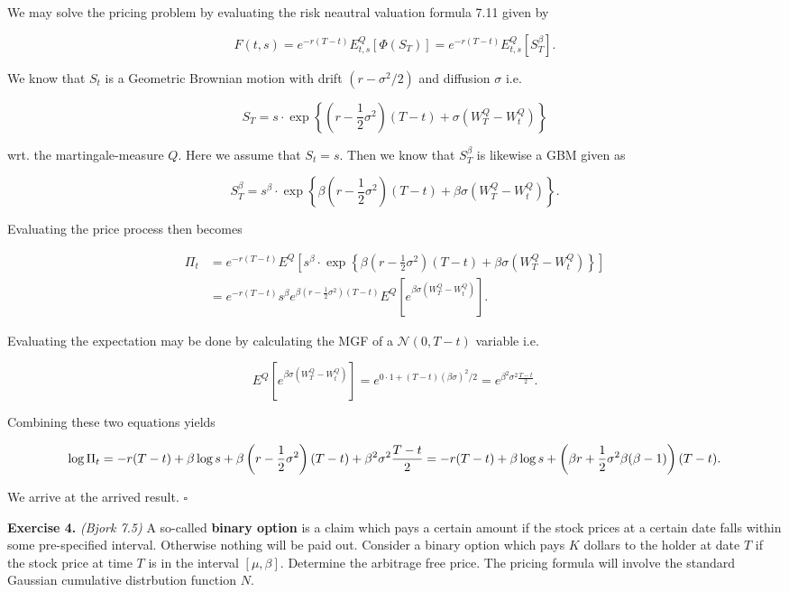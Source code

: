 \documentclass[
]{article}
\begin{document}
We may solve the pricing problem by evaluating the risk neautral
valuation formula 7.11 given by

\[
F(t,s)=e^{-r(T-t)}E^Q_{t,s}[\Phi(S_T)]=e^{-r(T-t)}E^Q_{t,s}[S_T^\beta].
\]

We know that \(S_t\) is a Geometric Brownian motion with drift
\((r-\sigma^2/2)\) and diffusion \(\sigma\) i.e.

\[
S_T=s\cdot\exp\left\{\left(r-\frac{1}{2}\sigma^2\right)(T-t)+\sigma (W_T^Q-W_t^Q)\right\}
\]

wrt. the martingale-measure \(Q\). Here we assume that \(S_t=s\). Then
we know that \(S_T^\beta\) is likewise a GBM given as

\[
S_T^\beta=s^\beta\cdot\exp\left\{\beta\left(r-\frac{1}{2}\sigma^2\right)(T-t)+\beta\sigma  (W_T^Q-W_t^Q)\right\}.
\]

Evaluating the price process then becomes

\begin{align*}
\Pi_t&=e^{-r(T-t)}E^Q\left[s^\beta\cdot\exp\left\{\beta\left(r-\frac{1}{2}\sigma^2\right)(T-t)+\beta\sigma  (W_T^Q-W_t^Q)\right\}\right]\\
&=e^{-r(T-t)}s^\beta e^{\beta\left(r-\frac{1}{2}\sigma^2\right)(T-t)}E^Q\left[e^{\beta\sigma(W_T^Q-W_t^Q)}\right].
\end{align*}

Evaluating the expectation may be done by calculating the MGF of a
\(\mathcal{N}(0,T-t)\) variable i.e.

\[
E^Q\left[e^{\beta\sigma(W_T^Q-W_t^Q)}\right]=e^{0\cdot 1+(T-t)(\beta\sigma)^2/2}=e^{\beta^2\sigma^2\frac{T-t}{2}}.
\]

Combining these two equations yields

\[
\log \Pi_t=-r(T-t)+\beta\log s+\beta\left(r-\frac{1}{2}\sigma^2\right)(T-t)+\beta^2\sigma^2\frac{T-t}{2}\\
=-r(T-t)+\beta\log s+\left(\beta r+\frac{1}{2}\sigma^2\beta(\beta-1)\right)(T-t).
\]

We arrive at the arrived result. \(\square\)

\textbf{Exercise 4.} \emph{(Bjork 7.5)} A so-called \textbf{binary
option} is a claim which pays a certain amount if the stock prices at a
certain date falls within some pre-specified interval. Otherwise nothing
will be paid out. Consider a binary option which pays \(K\) dollars to
the holder at date \(T\) if the stock price at time \(T\) is in the
interval \([\mu,\beta]\). Determine the arbitrage free price. The
pricing formula will involve the standard Gaussian cumulative
distrbution function \(N\).
\end{document}
